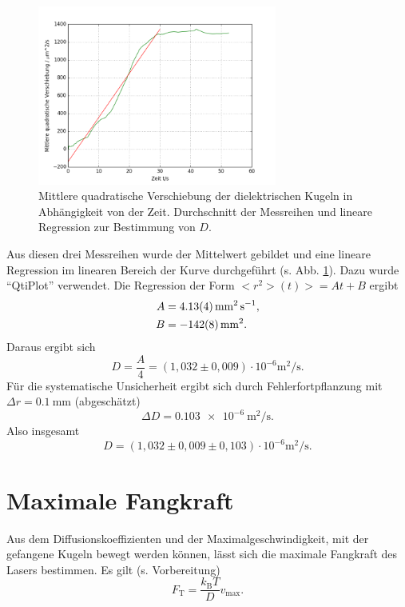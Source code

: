 \begin{figure}[tb]
	\centering\includegraphics[width=0.7\textwidth]{fig/brown_summe.png}
	\caption{Mittlere quadratische Verschiebung der dielektrischen Kugeln in Abhängigkeit von der Zeit. Durchschnitt der Messreihen und lineare Regression zur Bestimmung von $D$.}
	\label{fig:brown_summe}
\end{figure}

Aus diesen drei Messreihen wurde der Mittelwert gebildet und eine lineare Regression im linearen Bereich der Kurve durchgeführt (s. Abb. \ref{fig:brown_summe}). Dazu wurde ``QtiPlot'' verwendet.
Die Regression der Form $<r^{2}>(t)>=At+B$ ergibt
\begin{align}
 A &= \SI{4,13\pm0,04}{\milli\meter\squared\per\second}, \\
 B &= \SI{-142\pm8}{\milli\meter\squared}.
\end{align}
Daraus ergibt sich
\begin{equation}
 D = \frac{A}{4} = (1,032\pm0,009)\cdot 10^{-6}\si{\meter\squared\per\second}.
\end{equation}
Für die systematische Unsicherheit ergibt sich durch Fehlerfortpflanzung mit $\Delta r=\SI{0,1}{\milli\metre}$ (abgeschätzt)
\begin{equation}
 \Delta D= \SI{0,103e-6}{\meter\squared\per\second}.
\end{equation}
Also insgesamt
\begin{equation}
 D = (1,032\pm0,009\pm0,103)\cdot 10^{-6}\si{\meter\squared\per\second}.
\end{equation}


\section{Maximale Fangkraft}

Aus dem Diffusionskoeffizienten und der Maximalgeschwindigkeit, mit der gefangene Kugeln bewegt werden können, lässt sich die maximale Fangkraft des Lasers bestimmen. Es gilt (s. Vorbereitung)
\begin{equation}
 F_{\textrm{T}} = \frac{k_{\textrm{B}}T}{D} v_{\textrm{max}}.
\end{equation}

